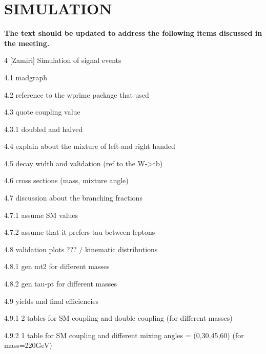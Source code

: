 \section{SIMULATION}\label{sec:simulation}

{\bf The text should be updated to address the following items discussed in the meeting.}

4 [Zamiri] Simulation of signal events

4.1 madgraph

4.2 reference to the wprime package that used

4.3 quote coupling value

4.3.1 doubled and halved

4.4 explain about the mixture of left-and right handed

4.5 decay width and validation (ref to the W->tb)

4.6 cross sections (mass, mixture angle)

4.7 discussion about the branching fractions

4.7.1 assume SM values

4.7.2 assume that it prefers tau between leptons

4.8 validation plots ??? / kinematic distributions

4.8.1 gen mt2 for different masses

4.8.2 gen tau-pt for different masses

4.9 yields and final efficiencies

4.9.1 2 tables for SM coupling and double coupling (for different masses)

4.9.2 1 table for SM coupling and different mixing angles = (0,30,45,60) (for mass=220GeV)


